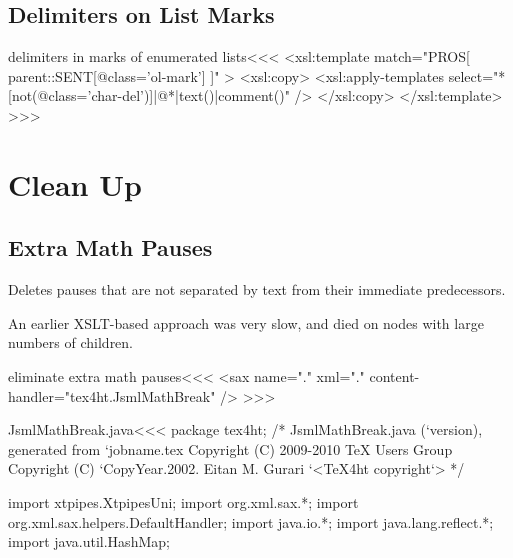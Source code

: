 \documentclass{article}
\begin{document}
\subsection{Delimiters on List Marks}



\<delimiters in marks of enumerated lists\><<<
<xsl:template match="PROS[  parent::SENT[@class='ol-mark'] ]" >
   <xsl:copy>
      <xsl:apply-templates 
           select="*[not(@class='char-del')]|@*|text()|comment()" />  
   </xsl:copy>
</xsl:template> 
>>>


\section{Clean Up}


\subsection{Extra Math Pauses}


Deletes pauses that are not separated by text from their immediate
predecessors. 

An earlier XSLT-based approach was very slow, and died
on nodes with large numbers of children.


\<eliminate extra math pauses\><<<
<sax name="." xml="." content-handler="tex4ht.JsmlMathBreak" />
>>>


 
\<JsmlMathBreak.java\><<< 
package tex4ht;
/* JsmlMathBreak.java (`version), generated from `jobname.tex
   Copyright (C) 2009-2010 TeX Users Group
   Copyright (C) `CopyYear.2002. Eitan M. Gurari
`<TeX4ht copyright`> */

import xtpipes.XtpipesUni;
import org.xml.sax.*;
import org.xml.sax.helpers.DefaultHandler;
import java.io.*;
import java.lang.reflect.*;
import java.util.HashMap;
\end{document}
